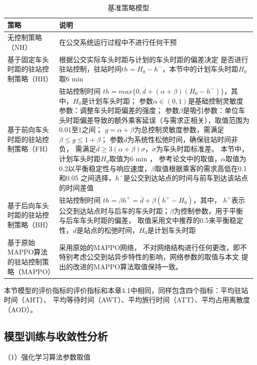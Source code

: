 \begin{table}[!ht]
\centering
\caption{基准策略模型}
\label{tab4-4}
\begin{tabular}{>{\centering\arraybackslash}m{4.5cm} >{\raggedright\arraybackslash}m{8cm}}
\toprule
\textbf{策略} & \textbf{说明}\\
\midrule
无控制策略（NH） & 在公交系统运行过程中不进行任何干预\\
基于固定车头时距的驻站控制策略（HH）& 根据公交实际车头时距与计划的车头时距的偏差决定
是否进行驻站控制，驻站时间$th=H_0-h^-$，本节中的计划车头时距$H_0$取6 min\\
基于前向车头时距的驻站控制策略（FH）\cite{daganzo2009headway} &  驻站控制时间
$th = max\{ 0,\overline{d}+(\alpha + \beta )(H_0 - h^-) \} $，其中，$H_0$是计划车头时距；
参数$\alpha \in (0,1)$是基础控制灵敏度参数：调整车头时距偏差的强度；
参数$\beta $是吸引参数：单位车头时距偏差导致的额外乘客延误（与需求正相关），取值范围为0.01至1之间；
$ g = \alpha + \beta $为总控制灵敏度参数，需满足$ \beta \leq  g \leq  1 + \beta$；
参数$\overline{d} $为系统性松弛时间，确保驻站时间非负，
需满足$ \overline{d} \geq 3 (\alpha + \beta)\sigma $，$\sigma $为车头时距标准差。
本节中，计划车头时距$H_0$取值为6 min ，
参考论文中的取值，$\alpha$取值为0.2以平衡稳定性与响应速度，$\beta $取值根据乘客的需求高低在0.1和0.05
之间选择，$h^-$是公交到达站点的时间与前车到达该站点的时间差值\\
基于后向车头时距的驻站控制策略（BH）\cite{xuan2011dynamic} & 驻站控制时间
$th = \beta h^+ = \overline{d} + \beta(h^+ - H_0)$，其中，
$h^+ $表示公交到达站点时与后车的车头时距；$\beta$为控制参数，用于平衡与后车车头时距的偏差，
取值采用文中推荐的0.5来平衡稳定性，$\overline{d}$是站点的松弛时间，$H_0$是计划车头时距\\
基于原始MAPPO算法的驻站控制策略（MAPPO） & 采用原始的MAPPO网络，
不对网络结构进行任何更改，即不特别考虑公交到站异步特性的影响，网络参数的取值与本文
提出的改进的MAPPO算法取值保持一致。\\
\bottomrule
\end{tabular}
\end{table}

本节模型的评价指标的评价指标和本章4.1中相同，同样包含四个指标：平均驻站时间（AHT）、
平均等待时间（AWT）、平均旅行时间（ATT）、平均占用离散度（AOD）。
\subsection{模型训练与收敛性分析}
（1）强化学习算法参数取值

